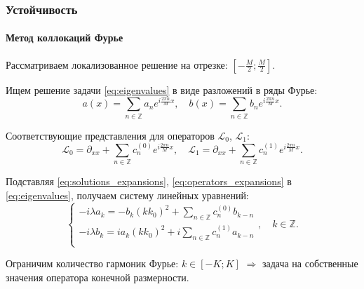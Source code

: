 \documentclass{beamer}
\begin{document}
\begin{frame}
	\frametitle{Устойчивость}
	\framesubtitle{Метод коллокаций Фурье}
	
	Рассматриваем локализованное решение на отрезке: $[-\frac{M}{2}; \frac{M}{2}]$.
	
	Ищем решение задачи \eqref{eq:eigenvalues} в виде разложений в ряды Фурье:
	\begin{equation}
		a(x) = \sum \limits_{n \in \mathbb{Z}} a_n e^{i \frac{2 \pi n}{M} x}, \quad b(x) = \sum \limits_{n \in \mathbb{Z}} b_n e^{i \frac{2 \pi n}{M} x}.
		\label{eq:solutions_expansions}
	\end{equation}
	
	Соответствующие представления для операторов $\mathcal{L}_0$, $\mathcal{L}_1$:
	\begin{equation}
		\mathcal{L}_0 = \partial_{xx} + \sum \limits_{n \in \mathbb{Z}} c_n^{(0)} e^{i \frac{2 \pi n}{M} x}, \quad \mathcal{L}_1 = \partial_{xx} + \sum \limits_{n \in \mathbb{Z}} c_n^{(1)} e^{i \frac{2 \pi n}{M} x}.
		\label{eq:operators_expansions}
	\end{equation}
	
	Подставляя \eqref{eq:solutions_expansions}, \eqref{eq:operators_expansions} в \eqref{eq:eigenvalues}, получаем систему линейных уравнений:
	\begin{equation}
		\begin{cases}
			-i \lambda a_k = -b_k (k k_0)^2 + \sum \limits_{n \in \mathbb{Z}} c_n^{(0)} b_{k - n} \\
			-i \lambda b_k = i a_k (k k_0)^2 + i \sum \limits_{n \in \mathbb{Z}} c_n^{(1)} a_{k - n} \\
		\end{cases}, \quad k \in \mathbb{Z}.
		\label{eq:system}
	\end{equation}
	
	Ограничим количество гармоник Фурье: $k \in [-K; K]$ $\Rightarrow$ задача на собственные значения оператора конечной размерности.
\end{frame}

\end{document}
